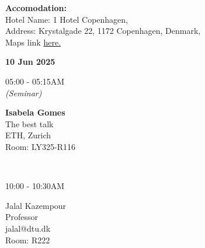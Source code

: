 \documentclass[10pt]{extarticle}
\begin{document}
\begin{center}
\begin{minipage}[t]{0.19\textwidth}
\begin{flushleft}
                \vspace{2cm}
                \textbf{Accomodation:} \\
                Hotel Name: 1 Hotel Copenhagen, \\
                Address: Krystalgade 22, 1172 Copenhagen, Denmark, \\
                Maps link \href{https://maps.app.goo.gl/w4DDhpL6Kiy48AfHA}{here.} \\
            \end{flushleft}
        \end{minipage}%
        \hspace{0.75cm}
        \vrule width 1pt
        \hspace{0.25cm}
        \begin{minipage}[t]{0.75\columnwidth}
            \begin{minipage}[t]{0.3333333333333333\columnwidth}
                \begin{flushleft}
                    \textbf{10 Jun 2025} \\
                \end{flushleft}
            \begin{minipage}[t]{0.3\columnwidth}
                05:00 - 05:15AM \\
                \textit{(Seminar)}
            \end{minipage}%
            \begin{minipage}[t]{0.65\columnwidth}
                \textbf{Isabela Gomes} \\
                The best talk \\
                ETH, Zurich \\
                Room: LY325-R116 \\
            \end{minipage}
            \vspace{0.01cm} \\
            \begin{minipage}[t]{0.3\columnwidth}
                10:00 - 10:30AM
            \end{minipage}%
            \begin{minipage}[t]{0.65\columnwidth}
                Jalal Kazempour \\
                Professor \\
                jalal@dtu.dk \\
                Room: R222 \\
            \end{minipage}

\end{minipage}
\end{minipage}
\end{center}
\end{document}
